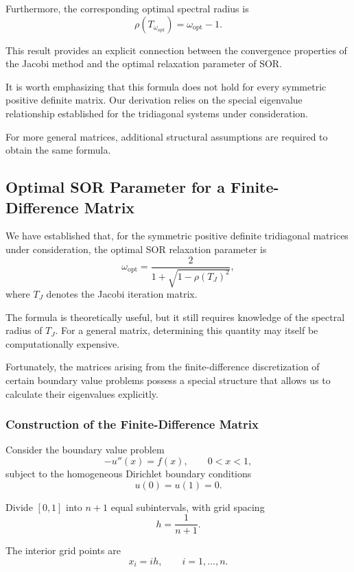 \documentclass[11pt,a4paper]{article}
\theoremstyle{definition}
\theoremstyle{remark}
\begin{document}
Furthermore, the corresponding optimal
spectral radius is
\begin{equation}
    \boxed{
    \rho(T_{\omega_{\mathrm{opt}}})
    =
    \omega_{\mathrm{opt}}-1.
    }
    \label{eq:sor_optimal_spectral_radius}
\end{equation}

This result provides an explicit connection
between the convergence properties of the
Jacobi method and the optimal relaxation
parameter of SOR.

It is worth emphasizing that this formula
does not hold for every symmetric positive
definite matrix. Our derivation relies on
the special eigenvalue relationship
established for the tridiagonal systems
under consideration.

For more general matrices, additional
structural assumptions are required to
obtain the same formula.


\subsection{Optimal SOR Parameter for a Finite-Difference Matrix}

We have established that, for the symmetric positive
definite tridiagonal matrices under consideration,
the optimal SOR relaxation parameter is
\[
    \omega_{\mathrm{opt}}
    =
    \frac{2}{1+\sqrt{1-\rho(T_J)^2}},
\]
where $T_J$ denotes the Jacobi iteration matrix.

The formula is theoretically useful, but it still
requires knowledge of the spectral radius of $T_J$.
For a general matrix, determining this quantity
may itself be computationally expensive.

Fortunately, the matrices arising from the
finite-difference discretization of certain
boundary value problems possess a special
structure that allows us to calculate their
eigenvalues explicitly.

\subsubsection*{Construction of the Finite-Difference Matrix}

Consider the boundary value problem
\[
    -u''(x)=f(x),
    \qquad 0<x<1,
\]
subject to the homogeneous Dirichlet
boundary conditions
\[
    u(0)=u(1)=0.
\]

Divide $[0,1]$ into $n+1$ equal subintervals,
with grid spacing
\[
    h=\frac{1}{n+1}.
\]

The interior grid points are
\[
    x_i=ih,
    \qquad i=1,\ldots,n.
\]
\end{document}
